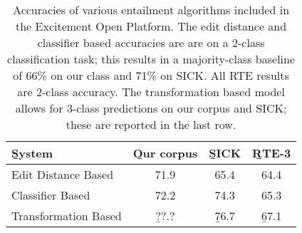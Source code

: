 %

%
%

\begin{table}
\begin{center}
\def\t#1{\small{#1}}
\begin{tabular}{l@{\hskip \colspaceL}c@{\hskip \colspaceL}c@{\hskip \colspaceL}c}
\toprule
\b{System} & \b{Our corpus} & \b{SICK} & \b{RTE-3} \\
\midrule
\t{Edit Distance Based}  & \t{71.9} & \t{65.4} & \t{64.4} \\
\t{Classifier Based}     & \t{72.2} & \t{74.3} & \t{65.3} \\
\midrule
\t{Transformation Based} & \b{??.?} & \b{76.7} & \b{67.1} \\
\bottomrule
\end{tabular}
\end{center}
\caption{
\label{tab:eopresults}
Accuracies of various entailment algorithms included in the
  Excitement Open Platform.
The edit distance and classifier based accuracies are are on a 2-class
  classification task; this results in a majority-class baseline
  of 66\% on our class and 71\% on SICK.
All RTE results are 2-class accuracy.
The transformation based model allows for 3-class predictions on our
  corpus and SICK; these are reported in the last row.
}
\end{table}
%
%


